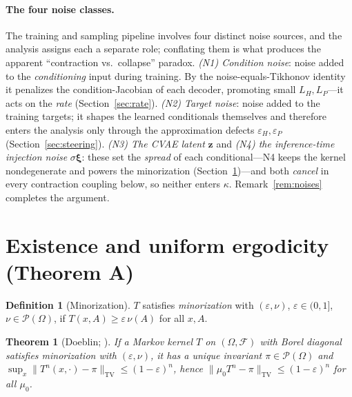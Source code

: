 \documentclass[11pt]{article}
\theoremstyle{plain}
\newtheorem{theorem}{Theorem}
\theoremstyle{definition}
\newtheorem{definition}{Definition}
\theoremstyle{remark}
\newcommand{\cF}{\mathcal{F}}
\newcommand{\cP}{\mathcal{P}}
\newcommand{\Om}{\Omega}
\newcommand{\TV}{\mathrm{TV}}
\newcommand{\norm}[1]{\lVert #1 \rVert}
\begin{document}
\paragraph{The four noise classes.}
The training and sampling pipeline involves four distinct noise sources, and the analysis assigns each
a separate role; conflating them is what produces the apparent ``contraction vs.\ collapse'' paradox.
\emph{(N1) Condition noise}: noise added to the \emph{conditioning} input during training. By the
noise-equals-Tikhonov identity \citep{bishop1995} it penalizes the condition-Jacobian of each decoder,
promoting small $L_H,L_P$---it acts on the \emph{rate} (Section~\ref{sec:rate}).
\emph{(N2) Target noise}: noise added to the training targets; it shapes the learned conditionals
themselves and therefore enters the analysis only through the approximation defects
$\varepsilon_H,\varepsilon_P$ (Section~\ref{sec:steering}).
\emph{(N3) The CVAE latent} $\bm z$ and \emph{(N4) the inference-time injection noise} $\sigma\bm\xi$:
these set the \emph{spread} of each conditional---N4 keeps the kernel nondegenerate and powers the
minorization (Section~\ref{sec:existence})---and both \emph{cancel} in every contraction coupling
below, so neither enters $\kappa$. Remark~\ref{rem:noises} completes the argument.

\section{Existence and uniform ergodicity (Theorem A)}
\label{sec:existence}

\begin{definition}[Minorization]
\label{def:minor}
$T$ satisfies \emph{minorization} with $(\varepsilon,\nu)$, $\varepsilon\in(0,1]$, $\nu\in\cP(\Om)$,
if $T(x,A)\ge\varepsilon\,\nu(A)$ for all $x,A$.
\end{definition}

\begin{theorem}[Doeblin; {\citealp[Ch.~16]{meyntweedie}}]
\label{thm:doeblin}
If a Markov kernel $T$ on $(\Om,\cF)$ with Borel diagonal satisfies minorization with
$(\varepsilon,\nu)$, it has a unique invariant $\pi\in\cP(\Om)$ and
$\sup_{x}\norm{T^n(x,\cdot)-\pi}_\TV\le(1-\varepsilon)^n$, hence
$\norm{\mu_0T^n-\pi}_\TV\le(1-\varepsilon)^n$ for all $\mu_0$.
\end{theorem}
\end{document}
